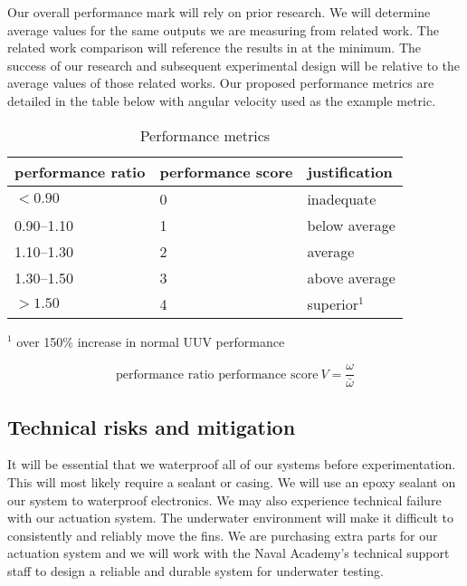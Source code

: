 \documentclass{IEEEtran}
\begin{document}
Our overall performance mark will rely on prior research. We will determine average values for the same outputs we are measuring from related work. The related work comparison will reference the results in \cite{berenice2018splash, orourke2020navy, hiller2012expanding} at the minimum. The success of our research and subsequent experimental design will be relative to the average values of those related works. Our proposed performance metrics are detailed in the table below with angular velocity used as the example metric.
\begin{table}
\caption{Performance metrics}
\label{tab:2}
\begin{center}
\begin{tabular}{lll}
\toprule
performance ratio & performance score & justification \\
\midrule 
$< \num{0.90}$ & 0 & inadequate \\
\numrange{0.90}{1.10} & 1 & below average \\
\numrange{1.10}{1.30} & 2 & average \\
\numrange{1.30}{1.50} & 3 & above average \\
$> \num{1.50}$ & 4 & superior$^1$\\
\bottomrule
\end{tabular}

\vspace{1em}
$^1$ over 150\% increase in normal UUV performance
\end{center}
\end{table}
\begin{equation}
\mbox{performance ratio performance score}\ V = \frac{\omega}{\bar{\omega}}
\label{eq:performance-ratio}
\end{equation}

\subsection{Technical risks and mitigation}
It will be essential that we waterproof all of our systems before experimentation. This will most likely require a sealant or casing. We will use an epoxy sealant on our system to waterproof electronics. We may also experience technical failure with our actuation system. The underwater environment will make it difficult to consistently and reliably move the fins. We are purchasing extra parts for our actuation system and we will work with the Naval Academy’s technical support staff to design a reliable and durable system for underwater testing.
\end{document}
